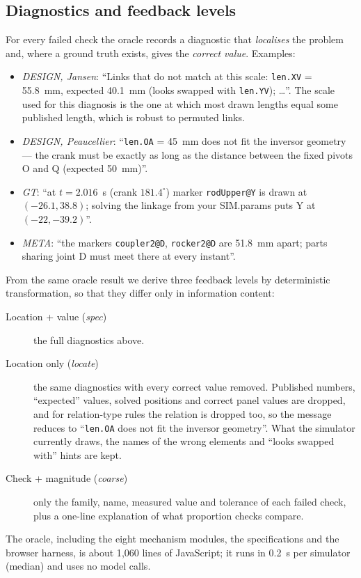 \subsection{Diagnostics and feedback levels}\label{sec:feedback}
For every failed check the oracle records a diagnostic that \emph{localises} the problem and, where a ground truth exists, gives the \emph{correct value}. Examples:
\begin{itemize}
\item \emph{DESIGN, Jansen}: ``Links that do not match at this scale: \texttt{len.XV} = 55.8~mm, expected 40.1~mm (looks swapped with \texttt{len.YV}); \ldots''. The scale used for this diagnosis is the one at which most drawn lengths equal some published length, which is robust to permuted links.
\item \emph{DESIGN, Peaucellier}: ``\texttt{len.OA} = 45~mm does not fit the inversor geometry --- the crank must be exactly as long as the distance between the fixed pivots O and Q (expected 50~mm)''.
\item \emph{GT}: ``at $t=2.016$~s (crank $181.4^\circ$) marker \texttt{rodUpper@Y} is drawn at $(-26.1, 38.8)$; solving the linkage from your SIM.params puts Y at $(-22, -39.2)$''.
\item \emph{META}: ``the markers \texttt{coupler2@D}, \texttt{rocker2@D} are 51.8~mm apart; parts sharing joint D must meet there at every instant''.
\end{itemize}
From the same oracle result we derive three feedback levels by deterministic transformation, so that they differ only in information content:
\begin{description}
\item[Location + value (\emph{spec})] the full diagnostics above.
\item[Location only (\emph{locate})] the same diagnostics with every correct value removed. Published numbers, ``expected'' values, solved positions and correct panel values are dropped, and for relation-type rules the relation is dropped too, so the message reduces to ``\texttt{len.OA} does not fit the inversor geometry''. What the simulator currently draws, the names of the wrong elements and ``looks swapped with'' hints are kept.
\item[Check + magnitude (\emph{coarse})] only the family, name, measured value and tolerance of each failed check, plus a one-line explanation of what proportion checks compare.
\end{description}
The oracle, including the eight mechanism modules, the specifications and the browser harness, is about 1{,}060 lines of JavaScript; it runs in 0.2~s per simulator (median) and uses no model calls.
